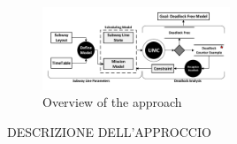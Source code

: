 

\begin{figure}[htp]
	\begin{centering}	
	\includegraphics[width=0.50\textwidth, clip]{img/processo}
	\caption{Overview of the approach}
	\label{fig:process}
	\end{centering}
\end{figure}

DESCRIZIONE DELL'APPROCCIO
